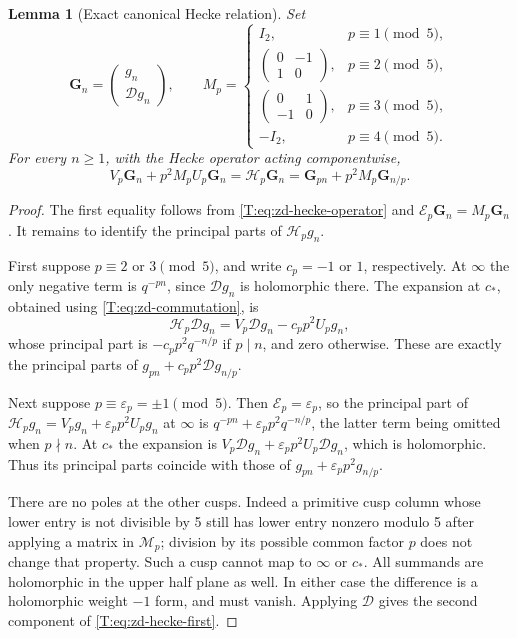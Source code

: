 \documentclass[11pt,a4paper]{article}
\newtheorem{lemma}[theorem]{Lemma}
\theoremstyle{definition}\newtheorem{definition}[theorem]{Definition}
\theoremstyle{remark}\newtheorem{remark}[theorem]{Remark}
\numberwithin{equation}{section}
\begin{document}
\begin{lemma}[Exact canonical Hecke relation]
\label{T:lem:zd-canonical-hecke}
Set
\[
 \mathbf{G}_n=\begin{pmatrix}g_n\\\mathcal{D}g_n\end{pmatrix},\qquad
 M_p=
 \begin{cases}
 I_2,&p\equiv1\pmod5,\\
 \begin{pmatrix}0&-1\\1&0\end{pmatrix},&p\equiv2\pmod5,\\
 \begin{pmatrix}0&1\\-1&0\end{pmatrix},&p\equiv3\pmod5,\\
 -I_2,&p\equiv4\pmod5.
 \end{cases}
\]
For every \(n\ge1\), with the Hecke operator acting componentwise,
\begin{equation}\label{T:eq:zd-hecke-first}
 V_p\mathbf{G}_n+p^2M_pU_p\mathbf{G}_n
   =\mathcal{H}_p\mathbf{G}_n
   =\mathbf{G}_{pn}+p^2M_p\mathbf{G}_{n/p}.
\end{equation}
\end{lemma}
\begin{proof}
The first equality follows from
\eqref{T:eq:zd-hecke-operator} and
\(\mathcal{E}_p\mathbf{G}_n=M_p\mathbf{G}_n\).
It remains to identify the principal parts of \(\mathcal{H}_pg_n\).

First suppose \(p\equiv2\) or \(3\pmod5\), and write
\(c_p=-1\) or \(1\), respectively.  At \(\infty\) the only
negative term is \(q^{-pn}\), since \(\mathcal{D}g_n\) is
holomorphic there.  The expansion at \(c_*\), obtained using
\eqref{T:eq:zd-commutation}, is
\[
 \mathcal{H}_p\mathcal{D}g_n
      =V_p\mathcal{D}g_n-c_pp^2U_pg_n,
\]
whose principal part is \(-c_pp^2q^{-n/p}\) if \(p\mid n\),
and zero otherwise.
These are exactly the principal parts of
\(g_{pn}+c_pp^2\mathcal{D}g_{n/p}\).

Next suppose \(p\equiv\varepsilon_p=\pm1\pmod5\).
Then \(\mathcal{E}_p=\varepsilon_p\), so the principal part
of \(\mathcal{H}_pg_n=V_pg_n+\varepsilon_pp^2U_pg_n\) at
\(\infty\) is
\(q^{-pn}+\varepsilon_pp^2q^{-n/p}\), the latter term
being omitted when \(p\nmid n\).
At \(c_*\) the expansion is
\(V_p\mathcal{D}g_n+\varepsilon_pp^2U_p\mathcal{D}g_n\),
which is holomorphic.  Thus its principal parts coincide
with those of \(g_{pn}+\varepsilon_pp^2g_{n/p}\).

There are no poles at the other cusps.  Indeed a primitive cusp
column whose lower entry is not divisible by 5 still has lower
entry nonzero modulo 5 after applying a matrix in \(\mathcal{M}_p\);
division by its possible common factor \(p\) does not change that
property.  Such a cusp cannot map to \(\infty\) or \(c_*\).
All summands are holomorphic in the upper half plane as well.
In either case the difference is a holomorphic weight \(-1\)
form, and must vanish.  Applying \(\mathcal{D}\) gives the
second component of \eqref{T:eq:zd-hecke-first}.
\end{proof}
\end{document}
